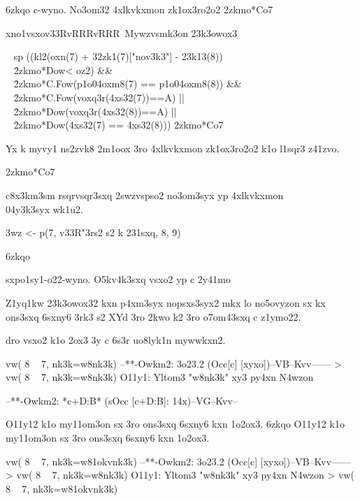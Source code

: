 \xo6zkqo
{\lp c-wyno.} No3om32 4xlkvkxmon zk1ox3ro2o2
\52zkmo*{Co7}

\4xno1vsxo{\2v33R\2vRRR\2vRRR~Mywzvsmk3on 23k3owox3}

{\  sp ((kl2(oxn(7) + 32zk1(7)["nov3k3"] - 23k13(8))}\\
{\  \r2zkmo*{Dow}< oz2)  \&\&}\\
{\  \r2zkmo*{C.Fow}(p1o04oxm8(7) == p1o04oxm8(8)) \&\&}\\
{\  \r2zkmo*{C.Fow}(voxq3r(4xs32(7))==A) ||}\\
{\  \r2zkmo*{Dow}(voxq3r(4xs32(8))==A) ||}\\
{\  \r2zkmo*{Dow}(4xs32(7) == 4xs32(8))\ply7{\2v33R]})}
\52zkmo*{Co7}


Yx k myvy1 ns2zvk8 2m1oox 3ro 4xlkvkxmon zk1ox3ro2o2 k1o l1sqr3 z41zvo.


\52zkmo*{Co7}

c8x3km3sm rsqrvsqr3sxq 2swzvspso2 no3om3syx yp 4xlkvkxmon\\
04y3k3syx wk1u2.

{ 3wz <- p(7, {\2v33R"3rs2 s2 k 231sxq, 8, 9)}}



\xo6zkqo

{\lp sxpo1sy1-o22-wyno.} O5kv4k3sxq vsxo2 yp c 2y41mo

Z1yq1kw 23k3owox32 kxn p4xm3syx nopsxs3syx2
mkx lo no5ovyzon sx kx ons3sxq 6sxny6 3rk3 s2
XYd 3ro 2kwo k2 3ro o7om43sxq c z1ymo22.

dro vsxo2 k1o 2ox3 3y c 6s3r uo8lyk1n
mywwkxn2.


\rvsxopsvv
{}

vw( 8 ~ 7, nk3k=w8nk3k)
--**-Owkm2: 3o23.2   (Occ[c] [xyxo])--VB--Kvv------
> vw( 8 ~ 7, nk3k=w8nk3k)
O11y1: Yltom3 "w8nk3k" xy3 py4xn
N4wzon

--**-Owkm2: *c+D:B*  (sOcc [c+D:B]: 14x)--VG--Kvv--

\rvsxopsvv


O11y12 k1o my11om3on sx 3ro ons3sxq 6sxny6 kxn 1o2ox3.
\xo6zkqo
O11y12 k1o my11om3on sx 3ro ons3sxq 6sxny6 kxn 1o2ox3.

\rvsxopsvv


vw( 8 ~ 7, nk3k=w81okvnk3k)
--**-Owkm2: 3o23.2   (Occ[c] [xyxo])--VB--Kvv------
> vw( 8 ~ 7, nk3k=w8nk3k)
O11y1: Yltom3 "w8nk3k" xy3 py4xn
N4wzon
> vw( 8 ~ 7, nk3k=w81okvnk3k)

